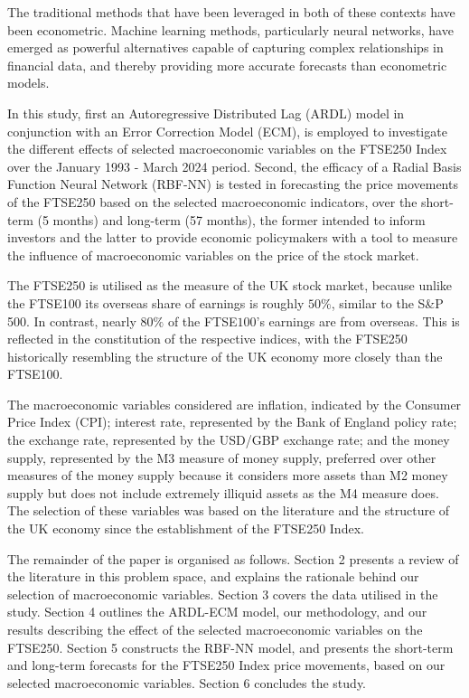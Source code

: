 \documentclass[11pt,a4paper]{article}
\begin{document}
The traditional methods that have been leveraged in both of these contexts have been econometric.
Machine learning methods, particularly neural networks, have emerged as powerful alternatives capable
of capturing complex relationships in financial data, and thereby providing more
accurate forecasts than econometric models.

In this study, first an Autoregressive Distributed Lag (ARDL) model in conjunction with an Error Correction Model (ECM), is employed to investigate 
the different effects of selected macroeconomic variables on the FTSE250 Index over the January 1993 - March 2024 period.
Second, the efficacy of a Radial Basis Function Neural Network (RBF-NN) is tested in forecasting the price movements of the FTSE250 based on the selected macroeconomic indicators, over the short-term 
(5 months) and long-term (57 months), the former intended to inform investors and the latter to provide
economic policymakers with a tool to measure the influence of macroeconomic variables on the price of the stock market. 


The FTSE250 is utilised as the measure of the UK stock market, because unlike the 
FTSE100 its overseas share of earnings is 
roughly $50\%$, similar to the S\&P 500. In contrast, nearly $80\%$ of the FTSE$100$'s earnings 
are from overseas. This is reflected in the constitution of the respective indices, with 
the FTSE250 historically resembling the structure 
of the UK economy more closely than the FTSE100.

The macroeconomic variables considered are inflation, indicated by the Consumer Price
Index (CPI); interest rate, represented by the Bank of England policy rate; the exchange rate, 
represented by the USD/GBP exchange rate; and the money supply, represented by the 
M3 measure of money supply, preferred over other 
measures of the money supply because it considers more assets than M2 money supply 
but does not include extremely illiquid assets as the M4 measure does. The selection 
of these variables was based on the literature and the structure of the UK economy since 
the establishment of the FTSE250 Index.

The remainder of the paper is organised as follows. 
Section 2 presents a review of the literature in this problem space, and explains the rationale behind our selection of macroeconomic variables.
Section 3 covers the data utilised in the study. Section 4 outlines the ARDL-ECM model, our methodology, and our results describing
the effect of the selected macroeconomic variables on the FTSE250. Section 5 constructs the RBF-NN model, and presents the short-term and long-term
forecasts for the FTSE250 Index price movements, based on our selected macroeconomic variables. Section 6 concludes the study.
\end{document}
